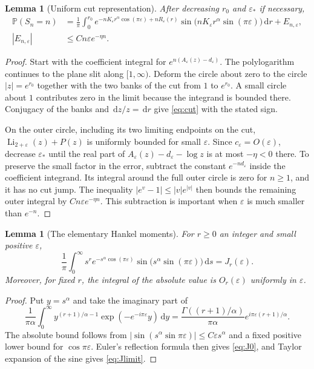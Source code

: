 \documentclass[11pt,a4paper]{article}
\newtheorem{lemma}[theorem]{Lemma}
\theoremstyle{definition}\newtheorem{definition}[theorem]{Definition}
\theoremstyle{remark}\newtheorem{remark}[theorem]{Remark}
\newcommand{\eps}{\varepsilon}
\newcommand{\Li}{\operatorname{Li}}
\newcommand{\Prob}{\mathbb P}
\newcommand{\1}{\mathbf 1}
\newcommand{\dd}{\,\mathrm d}
\begin{document}
\begin{lemma}[Uniform cut representation]\label{lem:cut}
After decreasing $r_0$ and $\eps_*$ if necessary,
\begin{align}
 \Prob(S_n=n)
 &=\frac1\pi\int_0^{r_0}
 e^{-nK_{\eps}r^{\alpha}\cos(\pi\eps)+nR_{\eps}(r)}
 \sin\bigl(nK_{\eps}r^{\alpha}\sin(\pi\eps)\bigr)\dd r
 +E_{n,\eps},\label{eq:cut}\\
 |E_{n,\eps}|&\le Cn\eps e^{-\eta n}.
 \label{eq:arcerror}
\end{align}
\end{lemma}
\begin{proof}
Start with the coefficient integral for
$e^{n(A_{\eps}(z)-d_{\eps})}$. The polylogarithm continues to the plane
slit along $[1,\infty)$. Deform the circle about zero to the circle
$|z|=e^{r_0}$ together with the two banks of the cut from $1$ to
$e^{r_0}$. A small circle about $1$ contributes zero in the limit because
the integrand is bounded there. Conjugacy of the banks and
$\dd z/z=\dd r$ give \eqref{eq:cut} with the stated sign.

On the outer circle, including its two limiting endpoints on the cut,
$\Li_{2+\eps}(z)+P(z)$ is uniformly bounded for small $\eps$. Since
$c_{\eps}=O(\eps)$, decrease $\eps_*$ until the real part of
$A_{\eps}(z)-d_{\eps}-\log z$ is at most $-\eta<0$ there.
To preserve the small factor in the error, subtract the constant
$e^{-nd_{\eps}}$ inside the coefficient integrand. Its integral around
the full outer circle is zero for $n\ge1$, and it has no cut jump.
The inequality $|e^v-1|\le |v|e^{|v|}$ then bounds the remaining outer
integral by $Cn\eps e^{-\eta n}$. This subtraction is important when
$\eps$ is much smaller than $e^{-n}$.
\end{proof}

\begin{lemma}[The elementary Hankel moments]\label{lem:moments}
For $r\ge0$ an integer and small positive $\eps$,
\begin{equation}\label{eq:momentintegral}
 \frac1\pi\int_0^\infty
 s^r e^{-s^{\alpha}\cos(\pi\eps)}
 \sin\bigl(s^{\alpha}\sin(\pi\eps)\bigr)\dd s
 =J_r(\eps).
\end{equation}
Moreover, for fixed $r$, the integral of the absolute value is $O_r(\eps)$
uniformly in $\eps$.
\end{lemma}
\begin{proof}
Put $y=s^{\alpha}$ and take the imaginary part of
\[
 \frac1{\pi\alpha}\int_0^\infty
 y^{(r+1)/\alpha-1}\exp(-e^{-i\pi\eps}y)\dd y
 =\frac{\Gamma((r+1)/\alpha)}{\pi\alpha}
   e^{i\pi\eps(r+1)/\alpha}.
\]
The absolute bound follows from
$|\sin(s^{\alpha}\sin\pi\eps)|\le C\eps s^{\alpha}$ and a fixed
positive lower bound for $\cos\pi\eps$. Euler's reflection formula
then gives \eqref{eq:J0}, and Taylor expansion of the sine gives
\eqref{eq:Jlimit}.
\end{proof}
\end{document}
